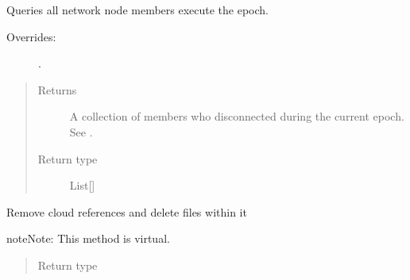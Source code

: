 \documentclass[letterpaper,10pt,english]{sphinxmanual}
\begin{document}
\begin{fulllineitems}
\begin{fulllineitems}
\end{fulllineitems}


\begin{fulllineitems}
\label{\detokenize{app.domain:app.domain.cluster_groups.SGCluster.nodes_execute}}
Queries all network node members execute the epoch.
\begin{description}
\item[{Overrides:}] \leavevmode
{\hyperref[\detokenize{app.domain:app.domain.cluster_groups.Cluster.nodes_execute}]{}}.

\end{description}
\begin{quote}\begin{description}
\item[{Returns}] \leavevmode
A collection of members who disconnected during the current
epoch. See
{\hyperref[\detokenize{app.domain:app.domain.network_nodes.Node.update_status}]{}}.

\item[{Return type}] \leavevmode
List{[}{\hyperref[\detokenize{app:app.type_hints.NodeType}]{}}{]}

\end{description}\end{quote}

\end{fulllineitems}


\begin{fulllineitems}
\label{\detokenize{app.domain:app.domain.cluster_groups.SGCluster.remove_cloud_reference}}
Remove cloud references and delete files within it

\begin{sphinxadmonition}{note}{Note:}
This method is virtual.
\end{sphinxadmonition}
\begin{quote}\begin{description}
\item[{Return type}] \leavevmode
{}


\end{description}
\end{quote}
\end{fulllineitems}
\end{fulllineitems}
\end{document}
